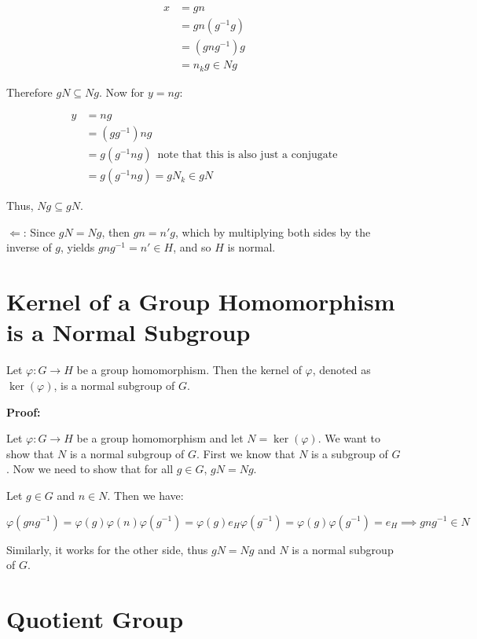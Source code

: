 \begin{align*}
	x & = gn           \\
	  & = gn(g^{-1}g)  \\
	  & = (gng^{-1})g  \\
	  & = n_k g \in Ng
\end{align*}

Therefore \(gN \subseteq Ng\). Now for \(y = ng\):

\begin{align*}
	y & = ng                                                             \\
	  & = (gg^{-1})ng                                                    \\
	  & = g(g^{-1}ng) \, \text{ note that this is also just a conjugate} \\
	  & = g(g^{-1}ng) = gN_k \in gN
\end{align*}

Thus, \(Ng \subseteq gN\).

\(\Leftarrow\): Since \(gN = Ng\), then \(gn = n'g\), which by multiplying both sides
by the inverse of \(g\), yields \(gng^{-1} = n' \in H\), and so \(H\) is normal.

\QED

\section{Kernel of a Group Homomorphism is a Normal Subgroup}

Let \(\varphi: G \to H\) be a group homomorphism. Then the kernel of \(\varphi\), denoted as \(\ker(\varphi)\),
is a normal subgroup of \(G\).

\textbf{Proof:}

Let \(\varphi: G \to H\) be a group homomorphism and let \(N = \ker(\varphi)\). We want to show that \(N\) is a normal subgroup of \(G\).
First we know that \(N\) is a subgroup of \(G\). Now we need to show that for all \(g \in G\), \(gN = Ng\).

Let \(g \in G\) and \(n \in N\). Then we have:

\[
	\varphi(gng^{-1}) = \varphi(g)\varphi(n)\varphi(g^{-1}) = \varphi(g)e_H\varphi(g^{-1}) = \varphi(g)\varphi(g^{-1}) = e_H \implies gng^{-1} \in N
\]

Similarly, it works for the other side, thus \(gN = Ng\) and \(N\) is a normal subgroup of \(G\).

\QED

\section{Quotient Group}

